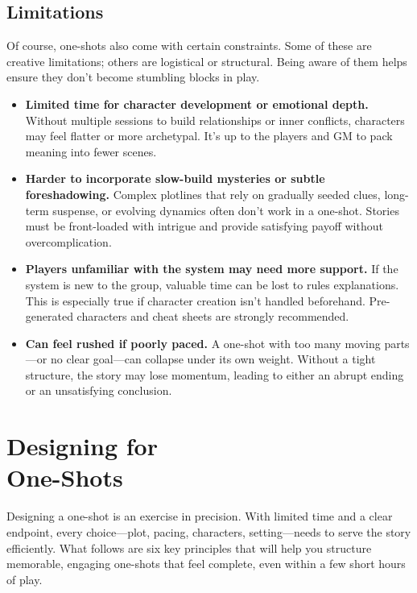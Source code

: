 \subsection*{Limitations}

Of course, one-shots also come with certain constraints. Some of these are creative limitations; others are logistical or structural. Being aware of them helps ensure they don’t become stumbling blocks in play.

\begin{itemize}
    \item \textbf{Limited time for character development or emotional depth.}  
    Without multiple sessions to build relationships or inner conflicts, characters may feel flatter or more archetypal. It’s up to the players and GM to pack meaning into fewer scenes.

    \item \textbf{Harder to incorporate slow-build mysteries or subtle foreshadowing.}  
    Complex plotlines that rely on gradually seeded clues, long-term suspense, or evolving dynamics often don’t work in a one-shot. Stories must be front-loaded with intrigue and provide satisfying payoff without overcomplication.

    \item \textbf{Players unfamiliar with the system may need more support.}  
    If the system is new to the group, valuable time can be lost to rules explanations. This is especially true if character creation isn’t handled beforehand. Pre-generated characters and cheat sheets are strongly recommended.

    \item \textbf{Can feel rushed if poorly paced.}  
    A one-shot with too many moving parts—or no clear goal—can collapse under its own weight. Without a tight structure, the story may lose momentum, leading to either an abrupt ending or an unsatisfying conclusion.
\end{itemize}


\section[Designing for One-Shots]{Designing for\\ One-Shots}

Designing a one-shot is an exercise in precision. With limited time and a clear endpoint, every choice—plot, pacing, characters, setting—needs to serve the story efficiently. What follows are six key principles that will help you structure memorable, engaging one-shots that feel complete, even within a few short hours of play.

